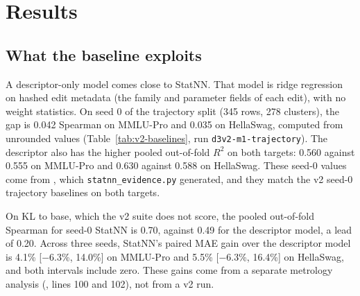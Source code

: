 \section{Results}
\subsection{What the baseline exploits}
\label{sec:exploits}
A descriptor-only model comes close to StatNN. That model is ridge regression on hashed edit metadata (the family and parameter fields of each edit), with no weight statistics. On seed 0 of the trajectory split (345 rows, 278 clusters), the gap is 0.042 Spearman on MMLU-Pro and 0.035 on HellaSwag, computed from unrounded values (Table~\ref{tab:v2-baselines}, run \texttt{d3v2-m1-trajectory}). The descriptor also has the higher pooled out-of-fold $R^2$ on both targets: 0.560 against 0.555 on MMLU-Pro and 0.630 against 0.588 on HellaSwag. These seed-0 values come from , which \texttt{statnn\_evidence.py} generated, and they match the v2 seed-0 trajectory baselines on both targets.

On KL to base, which the v2 suite does not score, the pooled out-of-fold Spearman for seed-0 StatNN is 0.70, against 0.49 for the descriptor model, a lead of 0.20. Across three seeds, StatNN's paired MAE gain over the descriptor model is 4.1\% [$-$6.3\%, 14.0\%] on MMLU-Pro and 5.5\% [$-$6.3\%, 16.4\%] on HellaSwag, and both intervals include zero. These gains come from a separate metrology analysis (, lines 100 and 102), not from a v2 run.

